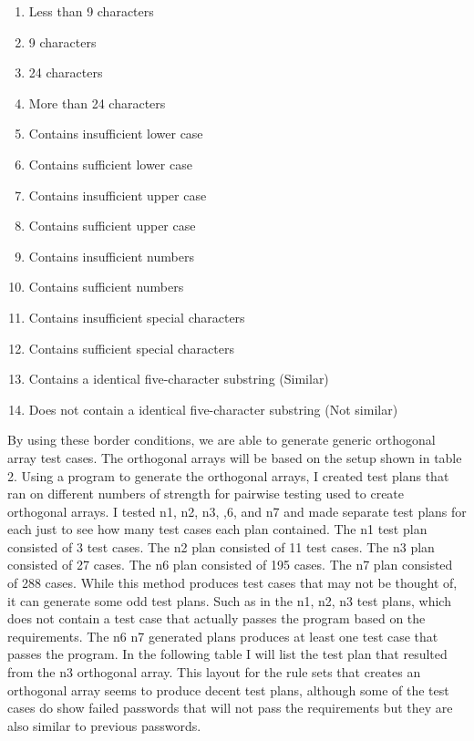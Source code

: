 \documentclass[12pt,letterpaper]{article}
\begin{document}
\begin{enumerate}
\item Less than 9 characters
\item 9 characters
\item 24 characters
\item More than 24 characters
\item Contains insufficient lower case
\item Contains sufficient lower case
\item Contains insufficient upper case
\item Contains sufficient upper case
\item Contains insufficient numbers
\item Contains sufficient numbers
\item Contains insufficient special characters
\item Contains sufficient special characters
\item Contains a identical five-character substring (Similar)
\item Does not contain a identical five-character substring (Not similar)
\end{enumerate}

By using these border conditions, we are able to generate generic orthogonal array test cases.  The orthogonal arrays will be based on the setup
shown in table 2. Using a program to generate the orthogonal arrays, I created test plans that ran on different numbers of
strength for pairwise testing used to create orthogonal arrays. I tested n1, n2, n3, ,6, and n7 and made separate test plans for each
just to see how many test cases each plan contained. The n1 test plan consisted of 3 test cases. The n2 plan consisted of 11 test cases.
The n3 plan consisted of 27 cases. The n6 plan consisted of 195 cases. The n7 plan consisted of 288 cases. While this method produces
test cases that may not be thought of, it can generate some odd test plans. Such as in the n1, n2, n3 test plans, which does not
contain a test case that actually passes the program based on the requirements. The n6 n7 generated plans produces at least one
test case that passes the program. In the following table I will list the test plan that resulted from the n3 orthogonal array.
This layout for the rule sets that creates an orthogonal array seems to produce decent test plans, although some of the test cases
do show failed passwords that will not pass the requirements but they are also similar to previous passwords.
\newline
\end{document}

